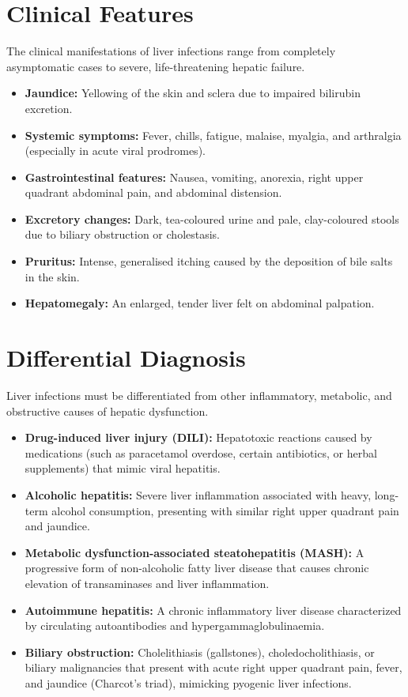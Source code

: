 \section*{Clinical Features}
The clinical manifestations of liver infections range from completely asymptomatic cases to severe, life-threatening hepatic failure.
\begin{itemize}
    \item \textbf{Jaundice:} Yellowing of the skin and sclera due to impaired bilirubin excretion.
    \item \textbf{Systemic symptoms:} Fever, chills, fatigue, malaise, myalgia, and arthralgia (especially in acute viral prodromes).
    \item \textbf{Gastrointestinal features:} Nausea, vomiting, anorexia, right upper quadrant abdominal pain, and abdominal distension.
    \item \textbf{Excretory changes:} Dark, tea-coloured urine and pale, clay-coloured stools due to biliary obstruction or cholestasis.
    \item \textbf{Pruritus:} Intense, generalised itching caused by the deposition of bile salts in the skin.
    \item \textbf{Hepatomegaly:} An enlarged, tender liver felt on abdominal palpation.
\end{itemize}

\section*{Differential Diagnosis}
Liver infections must be differentiated from other inflammatory, metabolic, and obstructive causes of hepatic dysfunction.
\begin{itemize}
    \item \textbf{Drug-induced liver injury (DILI):} Hepatotoxic reactions caused by medications (such as paracetamol overdose, certain antibiotics, or herbal supplements) that mimic viral hepatitis.
    \item \textbf{Alcoholic hepatitis:} Severe liver inflammation associated with heavy, long-term alcohol consumption, presenting with similar right upper quadrant pain and jaundice.
    \item \textbf{Metabolic dysfunction-associated steatohepatitis (MASH):} A progressive form of non-alcoholic fatty liver disease that causes chronic elevation of transaminases and liver inflammation.
    \item \textbf{Autoimmune hepatitis:} A chronic inflammatory liver disease characterized by circulating autoantibodies and hypergammaglobulinaemia.
    \item \textbf{Biliary obstruction:} Cholelithiasis (gallstones), choledocholithiasis, or biliary malignancies that present with acute right upper quadrant pain, fever, and jaundice (Charcot's triad), mimicking pyogenic liver infections.
\end{itemize}

